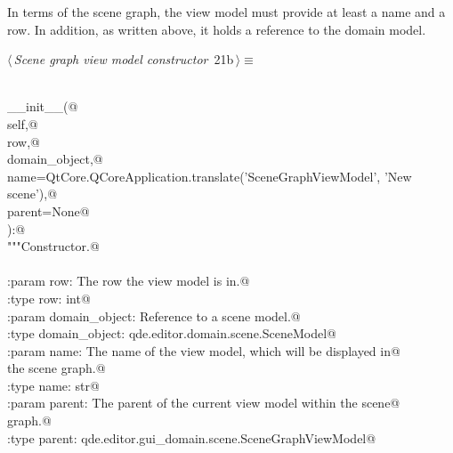 \documentclass[
    a4paper,      %
    10pt,         %
    openright,    %
    notitlepage,  %
    parskip=half, %
]{scrreprt}       %
\theoremstyle{definition}                    %
\begin{document}
In terms of the scene graph, the view model must provide at least a name and a
row. In addition, as written above, it holds a reference to the domain model.

\begin{flushleft} \small
\begin{minipage}{\linewidth}\label{scrap15}\raggedright\small
{} $\langle\,${\itshape Scene graph view model constructor}\nobreak\ {\footnotesize {21b}}$\,\rangle\equiv$
\vspace{-1ex}
\begin{list}{}{} \item
\mbox{}\lstinline@@\\
\mbox{}\lstinline@def __init__(@\\
\mbox{}\lstinline@        self,@\\
\mbox{}\lstinline@        row,@\\
\mbox{}\lstinline@        domain_object,@\\
\mbox{}\lstinline@        name=QtCore.QCoreApplication.translate('SceneGraphViewModel', 'New scene'),@\\
\mbox{}\lstinline@        parent=None@\\
\mbox{}\lstinline@):@\\
\mbox{}\lstinline@    """Constructor.@\\
\mbox{}\lstinline@@\\
\mbox{}\lstinline@    :param row:           The row the view model is in.@\\
\mbox{}\lstinline@    :type  row:           int@\\
\mbox{}\lstinline@    :param domain_object: Reference to a scene model.@\\
\mbox{}\lstinline@    :type  domain_object: qde.editor.domain.scene.SceneModel@\\
\mbox{}\lstinline@    :param name:          The name of the view model, which will be displayed in@\\
\mbox{}\lstinline@                          the scene graph.@\\
\mbox{}\lstinline@    :type  name:          str@\\
\mbox{}\lstinline@    :param parent:        The parent of the current view model within the scene@\\
\mbox{}\lstinline@                          graph.@\\
\mbox{}\lstinline@    :type parent:         qde.editor.gui_domain.scene.SceneGraphViewModel@\\

\end{list}
\end{minipage}
\end{flushleft}
\end{document}
